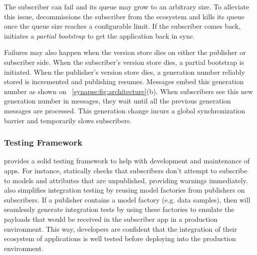 The subscriber can fail and its queue may grow to an arbitrary size. To
alleviate this issue, \synapse decommissions the subscriber from the
\synapse ecosystem and kills its queue once the queue size reaches a
configurable limit. If the subscriber comes back, \synapse initiates a
{\em partial bootstrap} to get the application back in sync.

Failures may also happen when the version store dies on either the publisher or subscriber
side. When the subscriber's version store dies, a partial bootstrap is initiated. When
the publisher's version store dies, a generation number reliably stored is incremented
and publishing resumes. Messages embed this generation number as shown on
\F~\ref{synapse:fig:architecture}(b). When subscribers see this new generation number
 in messages, they wait until all the previous generation messages are
processed. This generation change incurs a global synchronization barrier and
temporarily slows subscribers.

\subsubsection{Testing Framework}
\label{synapse:sec:testing}

\synapse provides a solid testing framework to help with development and
maintenance of apps.  For instance, \synapse statically checks that subscribers
don't attempt to subscribe to models and attributes that are unpublished,
providing warnings immediately. \synapse also simplifies integration testing by
reusing model factories from publishers on subscribers.  If a publisher
contains a model factory (e.g. data samples), then \synapse will seamlessly
generate integration tests by using these factories to emulate the payloads that
would be received in the subscriber app in a production environment.  This way,
developers are confident that the integration of their ecosystem of applications
is well tested before deploying into the production environment.

